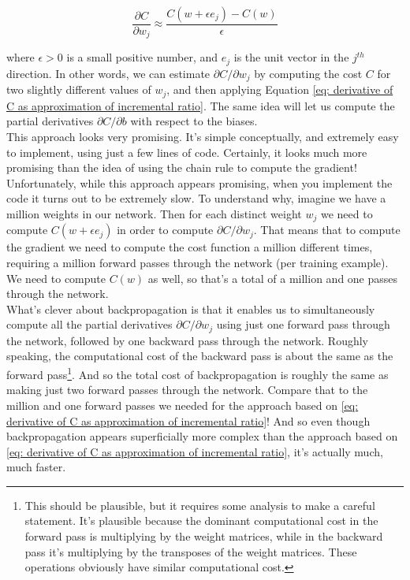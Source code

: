\begin{equation}
\frac{\partial C}{\partial w_j}\approx\frac{C(w+\epsilon e_j)- C(w)}{\epsilon}
\label{eq: derivative of C as approximation of incremental ratio}
\end{equation}

where $\epsilon>0$ is a small positive number, and $e_j$ is the unit vector in the $j^{th}$ direction. In other words, we can estimate $\partial C/\partial w_j$ by computing the cost $C$ for two slightly different values of $w_j$, and then applying Equation \ref{eq: derivative of C as approximation of incremental ratio}. The same idea will let us compute the partial derivatives $\partial C/\partial b$ with respect to the biases.\\

This approach looks very promising. It's simple conceptually, and extremely easy to implement, using just a few lines of code. Certainly, it looks much more promising than the idea of using the chain rule to compute the gradient!\\

Unfortunately, while this approach appears promising, when you implement the code it turns out to be extremely slow. To understand why, imagine we have a million weights in our network. Then for each distinct weight $w_j$ we need to compute $C(w+\epsilon e_j)$ in order to compute $\partial C/\partial w_j$. That means that to compute the gradient we need to compute the cost function a million different times, requiring a million forward passes through the network (per training example). We need to compute $C(w)$ as well, so that's a total of a million and one passes through the network.\\

What's clever about backpropagation is that it enables us to simultaneously compute all the partial derivatives $\partial C/\partial w_j$ using just one forward pass through the network, followed by one backward pass through the network. Roughly speaking, the computational cost of the backward pass is about the same as the forward pass\footnote{This should be plausible, but it requires some analysis to make a careful statement. It's plausible because the dominant computational cost in the forward pass is multiplying by the weight matrices, while in the backward pass it's multiplying by the transposes of the weight matrices. These operations obviously have similar computational cost.}. And so the total cost of backpropagation is roughly the same as making just two forward passes through the network. Compare that to the million and one forward passes we needed for the approach based on \ref{eq: derivative of C as approximation of incremental ratio}! And so even though backpropagation appears superficially more complex than the approach based on \ref{eq: derivative of C as approximation of incremental ratio}, it's actually much, much faster.\\
 
